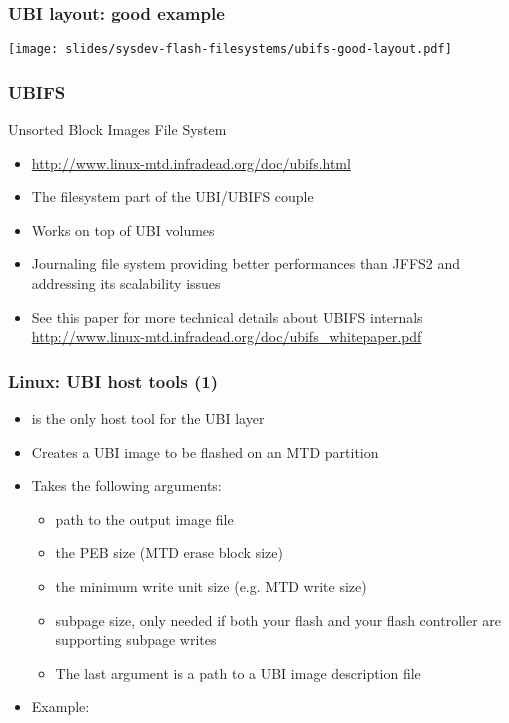\begin{frame}
  \frametitle{UBI layout: good example}
  \begin{center}
    \texttt{[image: slides/sysdev-flash-filesystems/ubifs-good-layout.pdf]}
  \end{center}
\end{frame}

\begin{frame}
  \frametitle{UBIFS}
  Unsorted Block Images File System
  \begin{itemize}
  \item \url{http://www.linux-mtd.infradead.org/doc/ubifs.html}
  \item The filesystem part of the UBI/UBIFS couple
  \item Works on top of UBI volumes
  \item Journaling file system providing better performances than
    JFFS2 and addressing its scalability issues
  \item See this paper for more technical details about UBIFS internals
    \url{http://www.linux-mtd.infradead.org/doc/ubifs_whitepaper.pdf}
  \end{itemize}
\end{frame}

\begin{frame}
  \frametitle{Linux: UBI host tools (1)}
  \begin{itemize}
  \item {} is the only host tool for the UBI layer
  \item Creates a UBI image to be flashed on an MTD partition
  \item Takes the following arguments:
    \begin{itemize}
    \item {} path to the output image file
    \item {} the PEB size (MTD erase block size)
    \item {} the minimum write unit size (e.g.
      MTD write size)
    \item {} subpage size, only needed if both
      your flash and your flash controller are supporting subpage
      writes
    \item The last argument is a path to a UBI image description file
    \end{itemize}
  \item Example: 
  \end{itemize}
\end{frame}

